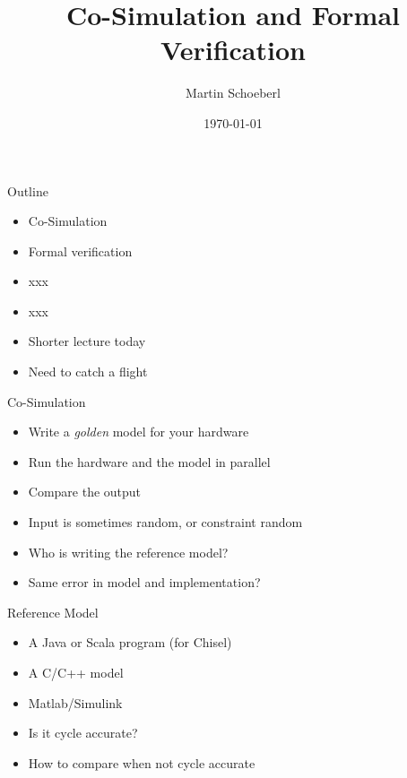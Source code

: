 

\newif\ifbook


\usepackage{tikz}
\usetikzlibrary{positioning, arrows.meta}


\title{Co-Simulation and Formal Verification}
\author{Martin Schoeberl}
\date{\today}



\begin{frame}
\titlepage
\end{frame}




\begin{frame}[fragile]{Outline}
\begin{itemize}
\item Co-Simulation
\item Formal verification
\item xxx
\item xxx
\item Shorter lecture today
\item Need to catch a flight
\end{itemize}
\end{frame}

\begin{frame}[fragile]{Co-Simulation}
\begin{itemize}
\item Write a \emph{golden} model for your hardware
\item Run the hardware and the model in parallel
\item Compare the output
\item Input is sometimes random, or constraint random
\item Who is writing the reference model?
\item Same error in model and implementation?
\end{itemize}
\end{frame}

\begin{frame}[fragile]{Reference Model}
\begin{itemize}
\item A Java or Scala program (for Chisel)
\item A C/C++ model
\item Matlab/Simulink
\item Is it cycle accurate?
\item How to compare when not cycle accurate
\end{itemize}
\end{frame}


